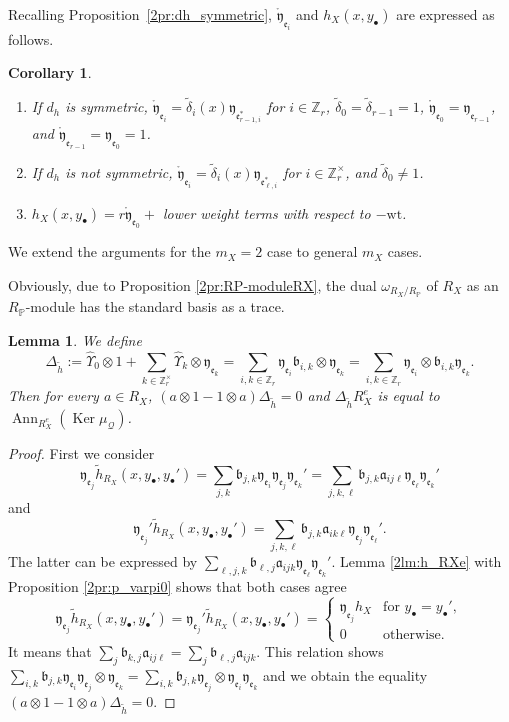\documentclass[10pt,a4paper]{amsart}
\def\ZZ{{\mathbb Z}}
\def\PP{{\mathbb P}}
\def\cQ{{\mathcal Q}}
\def\fa{{\mathfrak a}}
\def\fb{{\mathfrak b}}
\def\fe{{\mathfrak e}}
\def\fy{{\mathfrak y}}
\def\th{{\widetilde h}}
\def\tdelta{{\widetilde \delta}}
\def\hUpsilon{{\widehat \Upsilon}}
\def\rfy{{\mathring{\mathfrak y}}}
\def\Ker{\operatorname{Ker}}
\def\Ann{\operatorname{Ann}}
\def\wt{{\mathrm {wt}}}
\numberwithin{equation}{section}
\newtheorem{Corollary}[Theorem]{Corollary}
\newtheorem{Lemma}[Theorem]{Lemma}
\begin{document}
Recalling Proposition~\ref{2pr:dh_symmetric}, $\rfy_{\fe_i}$ and $h_{X}(x, y_{\bullet})$ are expressed as follows.
\begin{Corollary}\label{2cr:phi_h0}\quad
\begin{enumerate}\itemsep=0pt
\item[$1.$]
If $d_h$ is symmetric, $\rfy_{\fe_i}=\tdelta_i(x)\fy_{\fe_{r-1,i}^*}$
for $i\in \ZZ_r$,
$\tdelta_0=\tdelta_{r-1}=1$,
$\rfy_{\fe_0}=\fy_{\fe_{r-1}}$, and
$\rfy_{\fe_{r-1}}=\fy_{\fe_0}=1$.

\item[$2.$]
If $d_h$ is not symmetric, $\rfy_{\fe_i}=\tdelta_i(x)\fy_{\fe_{\ell,i}^*}$ for $i\in \ZZ_r^\times$, and $\tdelta_0\neq 1$.

\item[$3.$] $h_{X}(x, y_{\bullet})=r \rfy_{\fe_0}+$ lower weight terms with respect to $-\wt$.
\end{enumerate}
\end{Corollary}

We extend the arguments for the $m_X=2$ case to general $m_X$ cases.

Obviously, due to Proposition \ref{2pr:RP-moduleRX}, the dual $\omega_{R_X/R_\PP}$ of $R_X$ as an $R_\PP$-module has the standard basis as a trace.

\begin{Lemma}\label{2lm:Delta_th}
We define
\[
\Delta_{\th}:= \hUpsilon_{0}\otimes 1
+\sum_{k\in \ZZ_r^\times}
 \hUpsilon_{k}\otimes \fy_{\fe_k}
=\sum_{i,k\in \ZZ_r}\fy_{\fe_i}\fb_{i,k}\otimes \fy_{\fe_k}
=\sum_{i,k\in \ZZ_r}\fy_{\fe_i}\otimes\fb_{i,k} \fy_{\fe_k}.
\]
Then for every $a\in R_X$, $(a\otimes 1-1\otimes a)\Delta_{\th}=0$
and $\Delta_{\th}R_X^e$ is equal to $\Ann_{R_X^e}(\Ker \mu_\cQ)$.
\end{Lemma}

\begin{proof}
First we consider
\[
\fy_{\fe_j}\th_{R_X}(x, y_{\bullet}, y_{\bullet}') =\sum_{j,k}\fb_{j,k}\fy_{\fe_i}\fy_{\fe_j}\fy_{\fe_k}'=\sum_{j,k,\ell}\fb_{j,k}\fa_{i j\ell}\fy_{\fe_\ell}\fy_{\fe_k}'
\] and
\[ \fy_{\fe_j}'\th_{R_X}(x, y_{\bullet}, y_{\bullet}') =\sum_{j,k,\ell}\fb_{j,k}\fa_{i k\ell}\fy_{\fe_j}\fy_{\fe_\ell}'.\]
The latter can be expressed by $\sum_{\ell,j,k}\fb_{\ell,j}\fa_{i j k}\fy_{\fe_\ell}\fy_{\fe_k}'$.
Lemma \ref{2lm:h_RXe} with Proposition \ref{2pr:p_varpi0} shows that both cases agree
\[
\fy_{\fe_j}\th_{R_X}(x, y_{\bullet}, y_{\bullet}')
=\fy_{\fe_j}'\th_{R_X}(x, y_{\bullet}, y_{\bullet}')=
\begin{cases}
\fy_{\fe_j}h_X & \text{for } y_{\bullet} = y_{\bullet}',\\
0 & \text{otherwise}.
\end{cases}
\]
It means that $\sum_j \fb_{k,j}\fa_{i j\ell}=\sum_j \fb_{\ell,j}\fa_{i j k}$.
This relation shows
$\sum_{i,k}\fb_{j,k}\fy_{\fe_i}\fy_{\fe_j}\otimes \fy_{\fe_k}=\sum_{i,k}\fb_{j,k}\fy_{\fe_j}\otimes\fy_{\fe_i} \fy_{\fe_k}$
and we obtain the equality $(a\otimes 1-1\otimes a)\Delta_{\th}=0$.
\end{proof}
\end{document}

